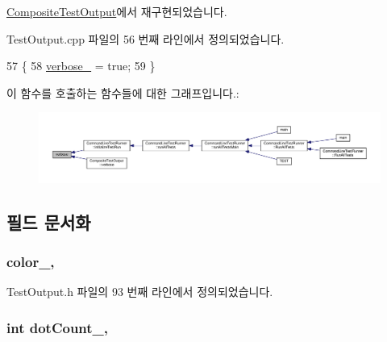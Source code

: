 \hyperlink{class_composite_test_output_a2ae0a8d48809abb33b5ba47c56fdc3ad}{Composite\+Test\+Output}에서 재구현되었습니다.



Test\+Output.\+cpp 파일의 56 번째 라인에서 정의되었습니다.


\begin{DoxyCode}
57 \{
58     \hyperlink{class_test_output_a86126da532c138842a42d8e9a52b0806}{verbose\_} = \textcolor{keyword}{true};
59 \}
\end{DoxyCode}


이 함수를 호출하는 함수들에 대한 그래프입니다.\+:
\nopagebreak
\begin{figure}[H]
\begin{center}
\leavevmode
\includegraphics[width=350pt]{class_test_output_a2ae0a8d48809abb33b5ba47c56fdc3ad_icgraph}
\end{center}
\end{figure}




\subsection{필드 문서화}
\subsubsection[{\texorpdfstring{color\+\_\+}{color_}}]{ color\+\_\+\hspace{0.3cm}{\ttfamily [protected]}, {\ttfamily [inherited]}}\hypertarget{class_test_output_adda8c1875964c3b80ed1c77b585fc756}{}\label{class_test_output_adda8c1875964c3b80ed1c77b585fc756}


Test\+Output.\+h 파일의 93 번째 라인에서 정의되었습니다.

\subsubsection[{\texorpdfstring{dot\+Count\+\_\+}{dotCount_}}]{\setlength{\rightskip}{0pt plus 5cm}int dot\+Count\+\_\+\hspace{0.3cm}{\ttfamily [protected]}, {\ttfamily [inherited]}}\hypertarget{class_test_output_a3c1c7e8cf0310d384198f0dc504251c6}{}\label{class_test_output_a3c1c7e8cf0310d384198f0dc504251c6}


